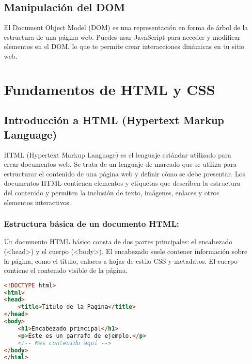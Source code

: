 \documentclass[executivepaper]{article}
\begin{document}
\subsection{Manipulación del DOM}
El Document Object Model (DOM) es una representación en forma de árbol de la estructura de una página web. Puedes usar JavaScript para acceder y modificar elementos en el DOM, lo que te permite crear interacciones dinámicas en tu sitio web.


\newpage
\section{Fundamentos de HTML y CSS}
\subsection{Introducción a HTML (Hypertext Markup Language)}

HTML (Hypertext Markup Language) es el lenguaje estándar utilizado para crear documentos web. Se trata de un lenguaje de marcado que se utiliza para estructurar el contenido de una página web y definir cómo se debe presentar. Los documentos HTML contienen elementos y etiquetas que describen la estructura del contenido y permiten la inclusión de texto, imágenes, enlaces y otros elementos interactivos.

\subsubsection*{Estructura básica de un documento HTML:}

Un documento HTML básico consta de dos partes principales: el encabezado (<head>) y el cuerpo (<body>). El encabezado suele contener información sobre la página, como el título, enlaces a hojas de estilo CSS y metadatos. El cuerpo contiene el contenido visible de la página.

\begin{lstlisting}[language=HTML]
<!DOCTYPE html>
<html>
<head>
    <title>Titulo de la Pagina</title>
</head>
<body>
    <h1>Encabezado principal</h1>
    <p>Este es un parrafo de ejemplo.</p>
    <!-- Mas contenido aqui -->
</body>
</html>  
\end{lstlisting}
\end{document}
